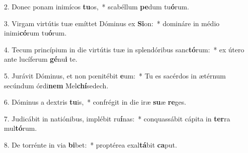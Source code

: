 2. Donec ponam inimícos \textbf{tu}os,~*  scabéllum \textbf{pe}dum tu\textbf{ó}rum.\

3. Virgam virtútis tuæ emíttet Dóminus ex \textbf{Si}on:~*  domináre in médio inimi\textbf{có}rum tu\textbf{ó}rum.\

4. Tecum princípium in die virtútis tuæ in splendóribus sanc\textbf{tó}rum:~*  ex útero ante lucíferum \textbf{gé}nu\textbf{i} te.\

5. Jurávit Dóminus, et non pœnitébit \textbf{e}um:~*  Tu es sacérdos in ætérnum secúndum órdi\textbf{nem} Mel\textbf{chí}sedech.\

6. Dóminus a dextris \textbf{tu}is,~*  confrégit in die iræ \textbf{su}æ \textbf{re}ges.\

7. Judicábit in natiónibus, implébit ru\textbf{í}nas:~*  conquassábit cápita in \textbf{ter}ra mul\textbf{tó}rum.\

8. De torrénte in via \textbf{bi}bet:~*  proptérea exal\textbf{tá}bit \textbf{ca}put.\

